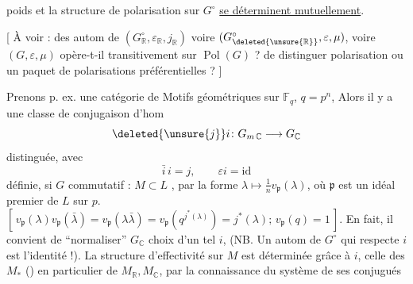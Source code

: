 poids et la structure de polarisation sur $G^\circ$
\uline{se déterminent mutuellement}.

 [ À voir :  des autom de $(G^\circ_{\mathbb R},\varepsilon_{\mathbb R},j_{\mathbb R})$
voire $(G^\circ_{\deleted{\unsure{\mathbb R}}},\varepsilon,\mu)$, voire $(G,\varepsilon,\mu)$ opère-t-il
transitivement sur $\operatorname{Pol}(G)$ ?  
    de distinguer  
polarisation ou un paquet de polarisations
préférentielles ? ]

Prenons p. ex. une catégorie de Motifs
géométriques sur $\mathbb F_q$, $q=p^n$,  Alors 
il y a une classe de conjugaison d'hom
\[
\deleted{\unsure{j}}i\colon G_{m\,\mathbb C}\longrightarrow G_{\mathbb C}
\]
distinguée, avec
\[
\bar i\,i=j,\qquad \varepsilon i=\mathrm{id}
\]
définie,  si $G$ commutatif : $M\subset L$ ,
par la forme $\lambda\mapsto\frac1n v_{\mathfrak p}(\lambda)$, où $\mathfrak p$ est un
idéal premier de $L$ sur $p$. $[\,v_{\mathfrak p}(\lambda)v_{\mathfrak p}(\bar\lambda)=
v_{\mathfrak p}(\lambda\bar\lambda)=v_{\mathfrak p}(q^{j^*(\lambda)})=j^*(\lambda);\,v_{\mathfrak p}(q)=1\,]$.
En fait, il convient de ``normaliser'' $G_{\mathbb C}$ choix
d'un tel $i$, (NB. Un autom de $G^\circ$  qui 
respecte $i$ est l'identité !). La structure d'effectivité
sur $M$ est déterminée grâce à $i$, celle
des $M_*$ () en particulier de $M_{\mathbb R},M_{\mathbb C}$,
par la connaissance du système de ses conjugués
